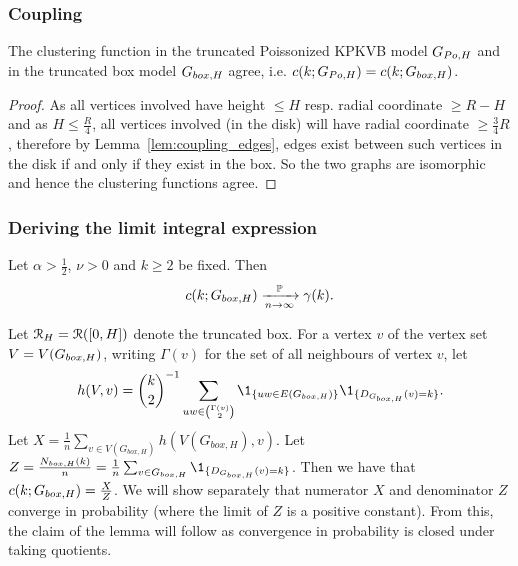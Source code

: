 \subsubsection{Coupling}
\begin{lemma}\label{lem:coup}
The clustering function in the truncated Poissonized KPKVB model $G_{Po,H}$ and in the truncated box model $G_{box,H}$ agree, i.e. $c(k;G_{Po,H}) = c(k;G_{box,H})$.
\end{lemma}
\begin{proof}
As all vertices involved have height $\leq H$ resp. radial coordinate $\geq R-H$ and as $H\leq \frac{R}{4}$, all vertices involved (in the disk)  will have radial coordinate $\geq \frac{3}{4}R$, therefore by Lemma~\ref{lem:coupling_edges}, edges exist between such vertices in the disk if and only if they exist in the box. So the two graphs are isomorphic and hence the clustering functions agree.
\end{proof}

\subsubsection{Deriving the limit integral expression}
\begin{lemma}\label{lem:lim}
Let $\alpha > \frac{1}{2}$, $\nu>0$ and $k\geq 2$ be fixed. Then
$$c(k;G_{box,H})\xrightarrow[n\rightarrow\infty]{\mathbb{P}}\gamma(k).$$
\end{lemma}

Let ${\mathcal R}_H = {\mathcal R}([0,H])$ denote the truncated box.
For a vertex $v$ of the vertex set $V=V(G_{box,H})$, writing $\Gamma(v)$ for the set of all neighbours of vertex $v$, let $$h(V,v) = {k \choose 2}^{-1} \sum_{uw \in {\Gamma(v) \choose 2}} \1_{\{uw \in E(\GboxH)\}} \1_{\{ D_{\GboxH}(v)=k\}}.$$
Let $X = \frac{1}{n}\sum_{v \in V(G_{box,H})} h(V(G_{box,H}),v)$. Let $Z = \frac{N_{box,H}(k)}{n} = \frac{1}{n}\sum_{v \in \GboxH} \1_{\{D_{\GboxH}(v)=k\}}$. Then we have that $c(k;G_{box,H}) = \frac{X}{Z}$. We will show separately that numerator $X$ and denominator $Z$ converge in probability (where the limit of $Z$ is a positive constant). From this, the claim of the lemma will follow as convergence in probability is closed under taking quotients.



